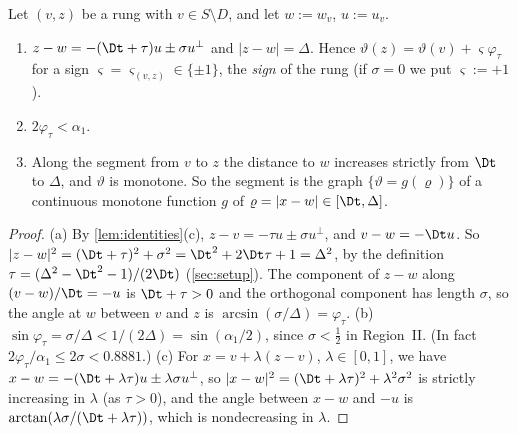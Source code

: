 \begin{lemma}\label{lem:IIrung}
Let $(v,z)$ be a rung with $v\in S\setminus D$, and let $w:=w_v$, $u:=u_v$.
\begin{enumerate}[label=\textup{(\alph*)}]
\item $z-w=-(\Dt+\tau)u\pm\sigma u^\perp$ and $|z-w|=\Delta$. Hence $\vartheta(z)=\vartheta(v)+\varsigma\varphi_\tau$ for a sign $\varsigma=\varsigma_{(v,z)}\in\{\pm1\}$, the \emph{sign} of the rung \textup{(}if $\sigma=0$ we put $\varsigma:=+1$\textup{)}.
\item $2\varphi_\tau<\alpha_1$.
\item Along the segment from $v$ to $z$ the distance to $w$ increases strictly from $\Dt$ to $\Delta$, and $\vartheta$ is monotone. So the segment is the graph $\{\vartheta=g(\varrho)\}$ of a continuous monotone function $g$ of $\varrho=|x-w|\in[\Dt,\Delta]$.
\end{enumerate}
\end{lemma}
\begin{proof}
(a) By \cref{lem:identities}(c), $z-v=-\tau u\pm\sigma u^\perp$, and $v-w=-\Dt u$. So $|z-w|^2=(\Dt+\tau)^2+\sigma^2=\Dt^2+2\Dt\tau+1=\Delta^2$, by the definition $\tau=(\Delta^2-\Dt^2-1)/(2\Dt)$ (\cref{sec:setup}). The component of $z-w$ along $(v-w)/\Dt=-u$ is $\Dt+\tau>0$ and the orthogonal component has length $\sigma$, so the angle at $w$ between $v$ and $z$ is $\arcsin(\sigma/\Delta)=\varphi_\tau$.
(b) $\sin\varphi_\tau=\sigma/\Delta<1/(2\Delta)=\sin(\alpha_1/2)$, since $\sigma<\frac12$ in Region~II. (In fact $2\varphi_\tau/\alpha_1\le2\sigma<0.8881$.)
(c) For $x=v+\lambda(z-v)$, $\lambda\in[0,1]$, we have $x-w=-(\Dt+\lambda\tau)u\pm\lambda\sigma u^\perp$, so $|x-w|^2=(\Dt+\lambda\tau)^2+\lambda^2\sigma^2$ is strictly increasing in $\lambda$ (as $\tau>0$), and the angle between $x-w$ and $-u$ is $\arctan(\lambda\sigma/(\Dt+\lambda\tau))$, which is nondecreasing in $\lambda$.
\end{proof}

